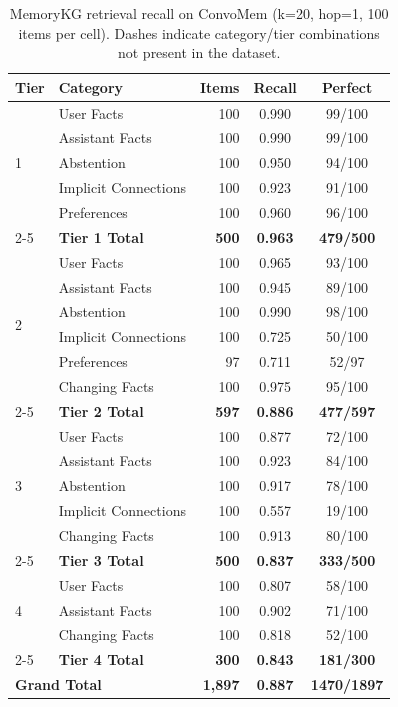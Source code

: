 \documentclass[11pt,a4paper]{article}
\begin{document}
\begin{table}[H]
\centering
\caption{MemoryKG retrieval recall on ConvoMem (k=20, hop=1, 100 items per cell).
         Dashes indicate category/tier combinations not present in the dataset.}
\label{tab:tier_results}
\begin{tabular}{llrcc}
  \toprule
  \textbf{Tier} & \textbf{Category} & \textbf{Items} & \textbf{Recall} & \textbf{Perfect} \\
  \midrule
  \multirow{5}{*}{1}
    & User Facts                & 100 & 0.990 &  99/100 \\
    & Assistant Facts           & 100 & 0.990 &  99/100 \\
    & Abstention                & 100 & 0.950 &  94/100 \\
    & Implicit Connections      & 100 & 0.923 &  91/100 \\
    & Preferences               & 100 & 0.960 &  96/100 \\
  \cmidrule{2-5}
    & \textbf{Tier 1 Total}     & \textbf{500} & \textbf{0.963} & \textbf{479/500} \\
  \midrule
  \multirow{6}{*}{2}
    & User Facts                & 100 & 0.965 &  93/100 \\
    & Assistant Facts           & 100 & 0.945 &  89/100 \\
    & Abstention                & 100 & 0.990 &  98/100 \\
    & Implicit Connections      & 100 & 0.725 &  50/100 \\
    & Preferences               &  97 & 0.711 &  52/97  \\
    & Changing Facts            & 100 & 0.975 &  95/100 \\
  \cmidrule{2-5}
    & \textbf{Tier 2 Total}     & \textbf{597} & \textbf{0.886} & \textbf{477/597} \\
  \midrule
  \multirow{5}{*}{3}
    & User Facts                & 100 & 0.877 &  72/100 \\
    & Assistant Facts           & 100 & 0.923 &  84/100 \\
    & Abstention                & 100 & 0.917 &  78/100 \\
    & Implicit Connections      & 100 & 0.557 &  19/100 \\
    & Changing Facts            & 100 & 0.913 &  80/100 \\
  \cmidrule{2-5}
    & \textbf{Tier 3 Total}     & \textbf{500} & \textbf{0.837} & \textbf{333/500} \\
  \midrule
  \multirow{3}{*}{4}
    & User Facts                & 100 & 0.807 &  58/100 \\
    & Assistant Facts           & 100 & 0.902 &  71/100 \\
    & Changing Facts            & 100 & 0.818 &  52/100 \\
  \cmidrule{2-5}
    & \textbf{Tier 4 Total}     & \textbf{300} & \textbf{0.843} & \textbf{181/300} \\
  \midrule
  \multicolumn{2}{l}{\textbf{Grand Total}}
                               & \textbf{1,897} & \textbf{0.887} & \textbf{1470/1897} \\
  \bottomrule
\end{tabular}
\end{table}
\end{document}
